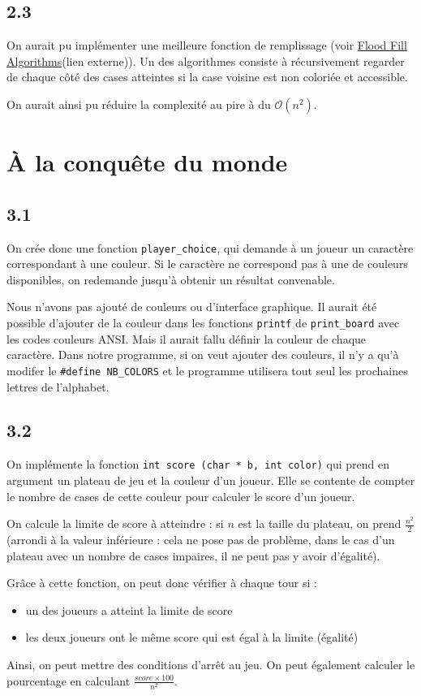 \documentclass[12pt]{article}
\def\question#1{\subsection*{#1}}
\def\sec#1{\section{#1}}
\begin{document}
\question{2.3}

On aurait pu implémenter une meilleure fonction de remplissage (voir \href{https://en.wikipedia.org/wiki/Flood_fill}{Flood Fill Algorithms}(lien externe)). Un des algorithmes consiste à récursivement regarder de chaque côté des cases atteintes si la case voisine est non coloriée et accessible.

On aurait ainsi pu réduire la complexité au pire à du $\mathcal{O}(n^2)$.


\sec{À la conquête du monde}
\question{3.1}
On crée donc une fonction \texttt{player\_choice}, qui demande à un joueur un caractère correspondant à une couleur. Si le caractère ne correspond pas à une de couleurs disponibles, on redemande jusqu'à obtenir un résultat convenable.

Nous n'avons pas ajouté de couleurs ou d'interface graphique. Il aurait été possible d'ajouter de la couleur dans les fonctions \texttt{printf} de \texttt{print\_board} avec les codes couleurs ANSI. Mais il aurait fallu définir la couleur de chaque caractère. Dans notre programme, si on veut ajouter des couleurs, il n'y a qu'à modifer le \texttt{\#define NB\_COLORS} et le programme utilisera tout seul les prochaines lettres de l'alphabet.


\question{3.2}
On implémente la fonction \texttt{int score (char * b, int color)} qui prend en argument un plateau de jeu et la couleur d'un joueur. Elle se contente de compter le nombre de cases de cette couleur pour calculer le score d'un joueur.

On calcule la limite de score à atteindre : si $n$ est la taille du plateau, on prend $\frac{n^2}{2}$ (arrondi à la valeur inférieure : cela ne pose pas de problème, dans le cas d'un plateau avec un nombre de cases impaires, il ne peut pas y avoir d'égalité).

Grâce à cette fonction, on peut donc vérifier à chaque tour si :
\begin{itemize}
\item un des joueurs a atteint la limite de score
\item les deux joueurs ont le même score qui est égal à la limite (égalité)
\end{itemize}

Ainsi, on peut mettre des conditions d'arrêt au jeu.
On peut également calculer le pourcentage en calculant $\frac{score \times 100}{n^2}$.
\end{document}
